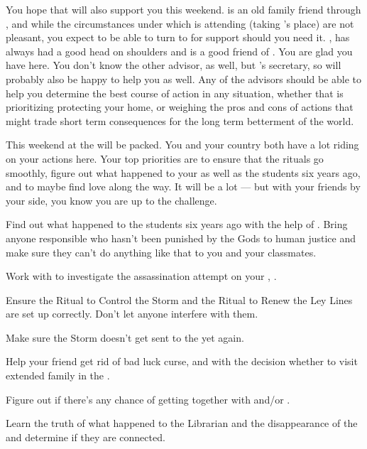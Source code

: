 \documentclass[char]{GL2020}
\begin{document}
You hope that \cEbbPriest{} will also support you this weekend. \cEbbPriest{} is an old family friend through \cHeadDiplomat{}, and while the circumstances under which \cEbbPriest{} is attending (taking \cHeadDiplomat{}’s place) are not pleasant, you expect to be able to turn to \cEbbPriest{\them} for support should you need it. \cBunker{\full}, has always had a good head on \cBunker{\their} shoulders and is a good friend of \cHeadDiplomat{}. You are glad you have \cBunker{} here. You don’t know the other advisor, \cChupLeader{\full} as well, but \cChupLeader{\they} \cChupLeader{\were} \cHeadDiplomat{}’s secretary, so \cChupLeader{\they} will probably also be happy to help you as well. Any of the advisors should be able to help you determine the best course of action in any situation, whether that is prioritizing protecting your home, or weighing the pros and cons of actions that might trade short term consequences for the long term betterment of the world.

This weekend at the \pSchool{} will be packed. You and your country both have a lot riding on your actions here. Your top priorities are to ensure that the rituals go smoothly, figure out what happened to your \cHeadDiplomat{\Auncle} \cHeadDiplomat{} as well as the students six years ago, and to maybe find love along the way. It will be a lot — but with your friends by your side, you know you are up to the challenge.

\begin{itemz}
    \item Find out what happened to the students six years ago with the help of \cHeir{}. Bring anyone responsible who hasn't been punished by the Gods to human justice and make sure they can't do anything like that to you and your classmates.
    \item Work with \cJuniorStatesman{} to investigate the assassination attempt on your \cHeadDiplomat{\auncle}, \cHeadDiplomat{}.
    \item Ensure the Ritual to Control the Storm and the Ritual to Renew the Ley Lines are set up correctly. Don't let anyone interfere with them.  
    \item Make sure the Storm doesn't get sent to the \pShip{} yet again.
    \item Help your friend \cInitiate{} get rid of \cInitiate{\their} bad luck curse, and with the decision whether to visit \cInitiate{\their} extended family in the \pFarm{}.
    \item Figure out if there's any chance of getting together with \cHeir{} and/or \cChupStudent{}.
    \item Learn the truth of what happened to the Librarian and the disappearance of the \iScythe{} and determine if they are connected.
\end{itemz}
\end{document}
